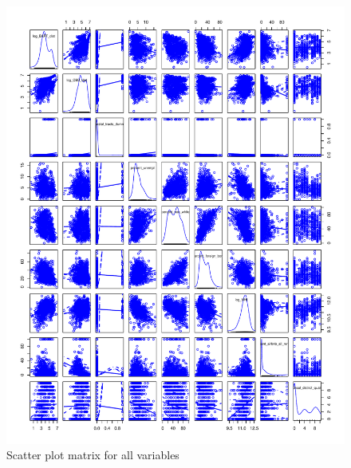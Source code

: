 \documentclass[10pt, letterpaper]{amsart}
\begin{document}
\begin{figure}[!htbp]
  \caption{Scatter plot matrix for all variables}
  \includegraphics[scale=0.6]{Scatter_plot_matrix_all_variables}
\end{figure}
\end{document}
